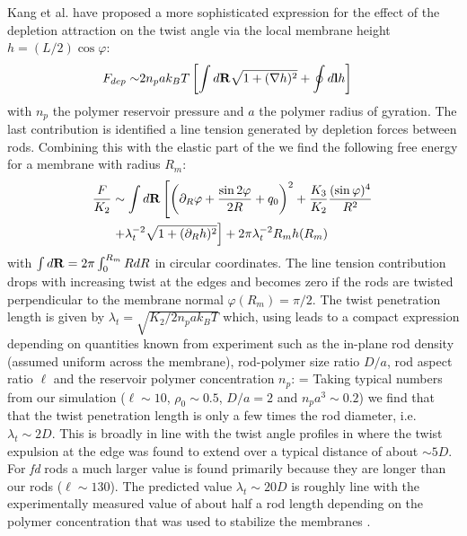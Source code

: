 Kang et al. \cite{kang_sm2016} have proposed a more sophisticated expression for the effect of the depletion attraction on the twist angle via the local membrane height $h = (L/2) \cos \varphi$: 
\begin{align}
F_{dep}  \sim & 2 n_{p} a k_{B}T \left [ \int  d {\bf R} \sqrt{ 1 + (\nabla h)^{2} } + \oint d {\bf l} h \right ]
\label{fdep1}
\end{align}
with $n_{p}$ the polymer reservoir pressure and $a$ the polymer radius of gyration. The last contribution is identified a line tension generated by depletion forces between rods. Combining this with the elastic part of the 
 we find the following free energy for a membrane with radius $R_{m}$:
\begin{align}
\frac{ F}{K_{2}}  &\sim \int  d {\bf R}   \left [  \left ( \partial_{R} \varphi + \frac{\sin 2 \varphi}{2R} + q_{0} \right )^{2}  + \frac{K_{3}}{K_{2}}\frac{ ( \sin \varphi )^{4}}{R^{2}} \right . \nonumber \\ 
& \left .  + \lambda_{t}^{-2}    \sqrt{ 1 + (\partial_{R} h)^{2} }   \right ]  + 2 \pi  \lambda_{t}^{-2} R_{m} h(R_{m})
\label{fmem1}
\end{align}
with $\int d {\bf R} = 2 \pi \int_{0}^{R_{m}} R dR $ in circular coordinates. The line tension contribution drops with increasing twist at the edges and  becomes zero if the rods are twisted perpendicular to the membrane normal $\varphi(R_{m}) = \pi/2$. 
The twist penetration length is given by $\lambda_{t} = \sqrt{K_{2}/2  n_{p} a k_{B}T}$ which, using  leads to a compact expression depending on quantities known from experiment such as the in-plane rod density (assumed uniform across the membrane), rod-polymer size ratio $D/a$, rod aspect ratio $\ell$ and the reservoir polymer concentration $n_{p}$: 
\beq
{} = 
\eeq
Taking typical numbers from our simulation ($\ell \sim 10$, $\rho_{0} \sim 0.5$, $D/a=2$ and $n_{p}a^{3} \sim 0.2$) we find that that the twist penetration length is only a few times the rod diameter, i.e. $\lambda_{t} \sim 2 D$. This is broadly in line with the twist angle profiles  in  where the twist expulsion at the edge was found to extend over a typical distance  of about $\sim 5D$.  
For {\em fd} rods a much larger value is found primarily because they are longer than our rods ($\ell \sim 130$). The predicted value $\lambda_{t} \sim 20 D$ is roughly line with the experimentally measured value of about half a rod length   depending on the polymer concentration that was used to stabilize the membranes \cite{barry_jpcb2009}.

